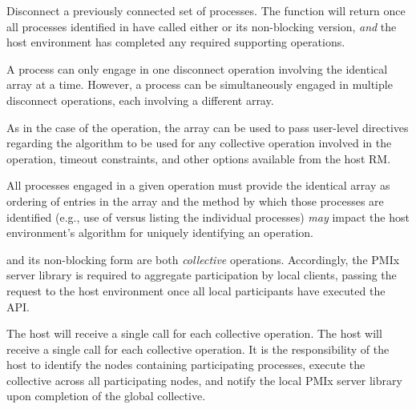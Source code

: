 
\optattrend

\descr

Disconnect a previously connected set of processes. The function will return once all processes identified in  have called either  or its non-blocking version, \textit{and} the host environment has completed any required supporting operations.

A process can only engage in one disconnect operation involving the identical  array at a time.
However, a process can be simultaneously engaged in multiple disconnect operations, each involving a different  array.

As in the case of the  operation, the  array can be used to pass user-level directives regarding the algorithm to be used for any collective operation involved in the operation, timeout constraints, and other options available from the host \ac{RM}.

\adviceuserstart
All processes engaged in a given  operation must provide the identical  array as ordering of entries in the array and the method by which those processes are identified (e.g., use of  versus listing the individual processes) \textit{may} impact the host environment's algorithm for uniquely identifying an operation.
\adviceuserend

\adviceimplstart
{} and its non-blocking form are both \emph{collective} operations. Accordingly, the \ac{PMIx} server library is required to aggregate participation by local clients, passing the request to the host environment once all local participants have executed the \ac{API}.
\adviceimplend

\advicermstart
The host will receive a single call for each collective operation. The host will receive a single call for each collective operation. It is the responsibility of the host to identify the nodes containing participating processes, execute the collective across all participating nodes, and notify the local \ac{PMIx} server library upon completion of the global collective.

\advicermend


\subsection{}

